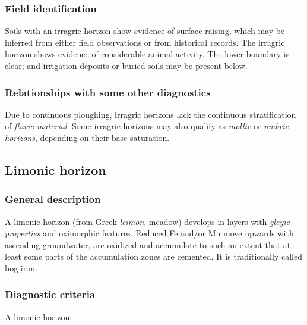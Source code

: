 \documentclass[
  letterpaper,
  DIV=11,
  numbers=noendperiod]{scrreprt}
\begin{document}
\hypertarget{field-identification-12}{%
\subsubsection{Field identification}\label{field-identification-12}}

Soils with an irragric horizon show evidence of surface raising, which
may be inferred from either field observations or from historical
records. The irragric horizon shows evidence of considerable animal
activity. The lower boundary is clear; and irrigation deposits or buried
soils may be present below.

\hypertarget{relationships-with-some-other-diagnostics-17}{%
\subsubsection{Relationships with some other
diagnostics}\label{relationships-with-some-other-diagnostics-17}}

Due to continuous ploughing, irragric horizons lack the continuous
stratification of \emph{fluvic material}. Some irragric horizons may
also qualify as \emph{mollic} or \emph{umbric horizons}, depending on
their base saturation.

\hypertarget{limonic-horizon}{%
\subsection{Limonic horizon}\label{limonic-horizon}}

\hypertarget{general-description-18}{%
\subsubsection{General description}\label{general-description-18}}

A limonic horizon (from Greek \emph{leimon}, meadow) develops in layers
with \emph{gleyic properties} and oximorphic features. Reduced Fe and/or
Mn move upwards with ascending groundwater, are oxidized and accumulate
to such an extent that at least some parts of the accumulation zones are
cemented. It is traditionally called bog iron.

\hypertarget{diagnostic-criteria-18}{%
\subsubsection{Diagnostic criteria}\label{diagnostic-criteria-18}}

A limonic horizon:
\end{document}
